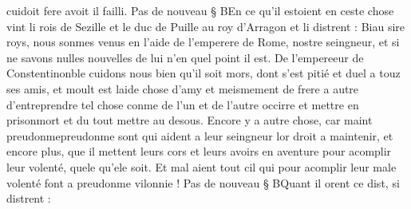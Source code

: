 \documentclass{article}
\begin{document}
\begin{pages}
   cuidoit fere avoit il failli. \pend
\pstart Pas de nouveau § BEn ce qu’il estoient en ceste chose vint 
   li rois de Sezille et 
   le duc de Puille au 
   roy d’Arragon et li distrent :
   Biau sire roys, nous sonmes venus en l’aide de 
   l’emperere de Rome, nostre seingneur, 
   et si ne savons nulles nouvelles de lui n’en quel point il est. 
   De l’empereeur de Constentinonble cuidons nous bien 
   qu’il soit mors, dont s’est pitié et duel a touz ses amis, et moult est laide chose d’amy et meismement de frere a autre d’entreprendre 
   tel chose conme de l’un et de l’autre occirre et mettre en prisonmort et 
      du tout mettre au desous. Encore y a autre chose, car maint 
      preudonmepreudonme sont qui aident a leur seingneur lor droit a 
      maintenir, et encore plus, que il mettent leurs cors et leurs avoirs en 
      aventure pour acomplir leur volenté, quele qu’ele soit. Et mal aient tout cil 
      qui pour acomplir leur male volenté font a preudonme vilonnie ! \pend
\pstart Pas de nouveau § BQuant il orent ce dist, si distrent :
         

\end{pages}
\end{document}
